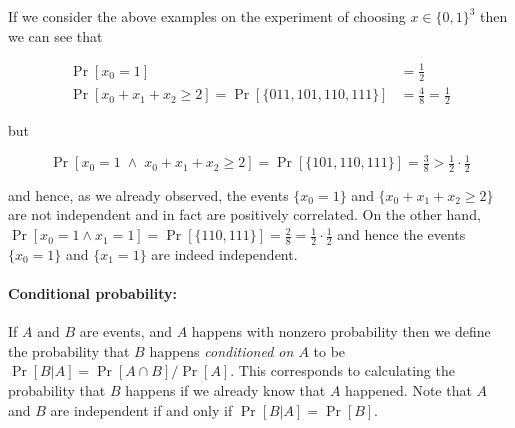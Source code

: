 If we consider the above examples on the experiment of choosing
\(x\in \{0,1\}^3\) then we can see that

\[
\begin{aligned}
\Pr[x_0=1] &= \tfrac{1}{2} \\
\Pr[x_0+x_1+x_2 \geq 2] = \Pr[\{ 011,101,110,111 \}] &= \tfrac{4}{8} = \tfrac{1}{2}
\end{aligned}
\]

but

\[
\Pr[x_0 =1 \; \wedge \; x_0+x_1+x_2 \geq 2 ] = \Pr[ \{101,110,111 \} ] = \tfrac{3}{8} > \tfrac{1}{2} \cdot \tfrac{1}{2}
\]

and hence, as we already observed, the events \(\{ x_0 = 1 \}\) and
\(\{ x_0+x_1+x_2 \geq 2 \}\) are not independent and in fact are
positively correlated. On the other hand,
\(\Pr[ x_0 = 1 \wedge x_1 = 1 ] = \Pr[ \{110,111 \}] = \tfrac{2}{8} = \tfrac{1}{2} \cdot \tfrac{1}{2}\)
and hence the events \(\{x_0 = 1 \}\) and \(\{ x_1 = 1 \}\) are indeed
independent.

\hypertarget{disjoint}{}

\paragraph{Conditional probability:} If \(A\) and \(B\) are events, and
\(A\) happens with nonzero probability then we define the probability
that \(B\) happens \emph{conditioned on \(A\)} to be
\(\Pr[B|A] = \Pr[A \cap B]/\Pr[A]\). This corresponds to calculating the
probability that \(B\) happens if we already know that \(A\) happened.
Note that \(A\) and \(B\) are independent if and only if
\(\Pr[B|A]=\Pr[B]\).

